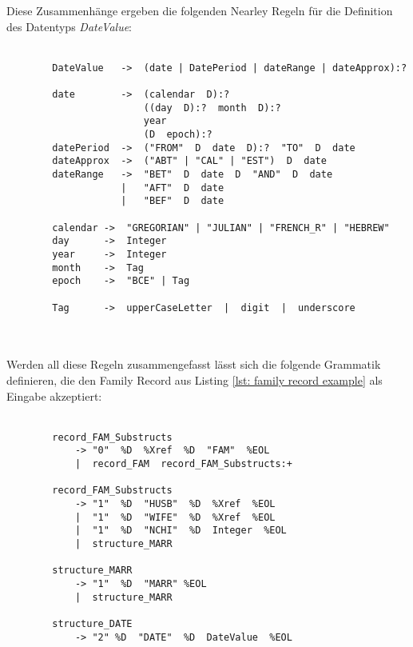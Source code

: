 Diese Zusammenhänge ergeben die folgenden Nearley Regeln für die Definition des Datentyps \textit{DateValue}:
\\ \\
\begin{minipage}{1.0\textwidth} \small
	\begin{lstlisting}
		DateValue   ->  (date | DatePeriod | dateRange | dateApprox):?
		
		date        ->  (calendar  D):?  
						((day  D):?  month  D):?  
						year  
						(D  epoch):?
		datePeriod  ->  ("FROM"  D  date  D):?  "TO"  D  date
		dateApprox  ->  ("ABT" | "CAL" | "EST")  D  date 
		dateRange   ->  "BET"  D  date  D  "AND"  D  date  
					|   "AFT"  D  date  
					|   "BEF"  D  date 
		
		calendar ->  "GREGORIAN" | "JULIAN" | "FRENCH_R" | "HEBREW"
		day      ->  Integer  
		year 	 ->  Integer
		month    ->  Tag
		epoch    ->  "BCE" | Tag
		
		Tag 	 ->  upperCaseLetter  |  digit  |  underscore 
	\end{lstlisting}
	\label{lst: nearley regel date}
\end{minipage}
\\ \\ 
Werden all diese Regeln zusammengefasst lässt sich die folgende Grammatik definieren, die den Family Record aus Listing \ref{lst: family record example} als Eingabe akzeptiert:
\\ \\
\begin{minipage}{1.0\textwidth} \small
	\begin{lstlisting}
		record_FAM_Substructs
			-> "0"  %D  %Xref  %D  "FAM"  %EOL 
			|  record_FAM  record_FAM_Substructs:+
		
		record_FAM_Substructs 
			-> "1"  %D  "HUSB"  %D  %Xref  %EOL
			|  "1"  %D  "WIFE"  %D  %Xref  %EOL 
			|  "1"  %D  "NCHI"  %D  Integer  %EOL 
			|  structure_MARR 
		
		structure_MARR
			-> "1"  %D  "MARR" %EOL
			|  structure_MARR  
		
		structure_DATE
			-> "2" %D  "DATE"  %D  DateValue  %EOL
	\end{lstlisting}
	\label{lst: vollständige nearley grammatik family record}
\end{minipage}
\\ \\ 
